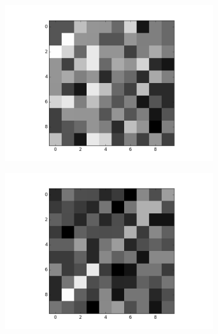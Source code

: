 \begin{figure}[h!]
	
	\begin{subfigure}{.25\textwidth}
  		\centering
  		\includegraphics[width=\linewidth]{imgs/reconst/00002.png}
  		\label{fig:sub1}
	\end{subfigure}%
	\begin{subfigure}{.25\textwidth}
  		\centering
  		\includegraphics[width=\linewidth]{imgs/reconst/00004.png}
  		\label{fig:sub1}
	\end{subfigure}%
	\begin{subfigure}{.25\textwidth}
  		\centering

\end{subfigure}
\end{figure}
